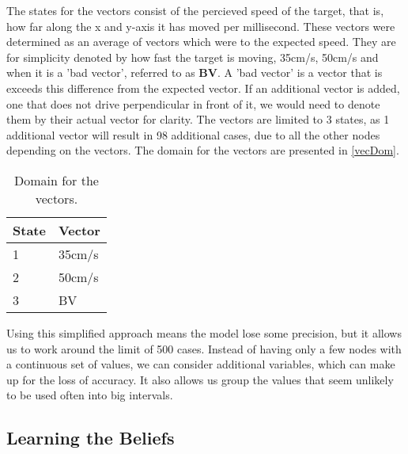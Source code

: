 The states for the vectors consist of the percieved speed of the target, that
is, how far along the x and y-axis it has moved per millisecond. These vectors
were determined as an average of vectors which were  to the expected speed. They are for simplicity denoted by how fast
the target is moving, 35cm/s, 50cm/s and when it is a 'bad vector', referred to as
\textbf{BV}. A 'bad vector' is a vector that is exceeds this difference from
the expected vector. If an additional vector is added, one that does not drive
perpendicular in front of it, we would need to denote them by their actual
vector for clarity. The vectors are limited to 3 states, as 1 additional vector
will result in 98 additional cases, due to all the other nodes depending on the
vectors. The domain for the vectors are presented in \autoref{vecDom}.

\begin{table}[H]
\centering
\begin{tabular}{l|l}
State & Vector \\ \hline
1     & 35cm/s \\
2     & 50cm/s \\
3     & BV
\end{tabular}
\caption{Domain for the vectors.}
\label{vecDom}
\end{table}

Using this simplified approach means the model lose some precision, but it
allows us to work around the limit of 500 cases. Instead of having only a few
nodes with a continuous set of values, we can consider additional variables,
which can make up for the loss of accuracy. It also allows us group the values
that seem unlikely to be used often into big intervals.

\subsection{Learning the Beliefs}


